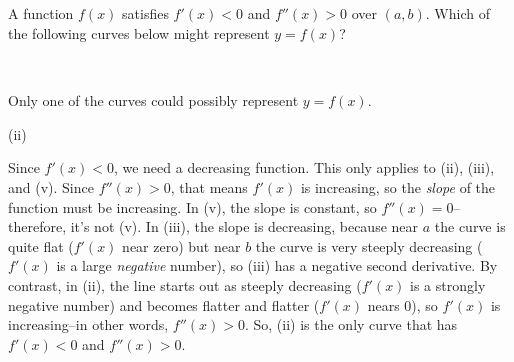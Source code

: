 \subsection*{\Application}

\begin{Mquestion}
A function $f(x)$ satisfies $f'(x)<0$ and $f''(x)>0$ over $(a,b)$. Which of the following curves below might represent $y=f(x)$?
\begin{center}
\hfill
{}\hfill
{}

\hfill
{}\hfill
{}
\hfill~
\end{center}
\end{Mquestion}
\begin{hint} Only one of the curves could possibly represent $y=f(x)$.
\end{hint}
\begin{answer} (ii)
\end{answer}
\begin{solution}
Since $f'(x)<0$, we need a decreasing function. This only applies to (ii), (iii), and  (v). Since $f''(x)>0$, that means $f'(x)$ is increasing, so the \emph{slope} of the function must be increasing. In (v), the slope is constant, so $f''(x)=0$--therefore, it's not (v).
In (iii), the slope is decreasing, because near $a$ the curve is quite flat ($f'(x)$ near zero) but near $b$ the curve is very steeply decreasing ($f'(x)$ is a large \emph{negative} number), so (iii) has a negative second derivative. By contrast, in (ii), the line starts out as steeply decreasing ($f'(x)$ is a strongly negative number) and becomes flatter and flatter ($f'(x)$ nears 0), so $f'(x)$ is increasing--in other words, $f''(x)>0$. So, (ii) is the only curve that has $f'(x)<0$ and $f''(x)>0$.
\end{solution}



